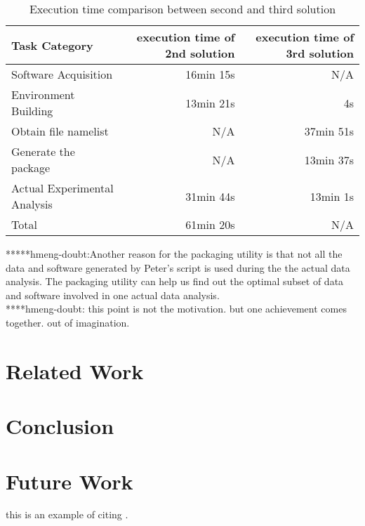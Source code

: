 \documentclass{article}
\begin{document}
\begin{table}
    \centering
    \begin{tabular}{|l|r|r|}
    \hline
    Task Category & execution time of 2nd solution & execution time of 3rd solution \\ \hline
    Software Acquisition & 16min 15s & N/A \\ \hline
    Environment Building & 13min 21s  & 4s \\ \hline
    Obtain file namelist & N/A & 37min 51s \\ \hline
    Generate the package & N/A & 13min 37s \\ \hline
    Actual Experimental Analysis & 31min 44s & 13min 1s \\ \hline
    Total & 61min 20s & N/A \\ \hline
    \end{tabular}
    \caption{Execution time comparison between second and third solution}
    \label{table:time-2nd3rd}
\end{table}    

*****hmeng-doubt:Another reason for the packaging utility is that not all the data and software generated by Peter’s script is used during the the actual data analysis. The packaging utility can help us find out the optimal subset of data and software involved in one actual data analysis. \\
\indent *****hmeng-doubt: this point is not the motivation. but one achievement comes together. out of imagination.\\

\section{Related Work }

\section{Conclusion}

\section{Future Work}
\indent this is an example of citing \cite{Laboratories79make}. \\



\end{document}
